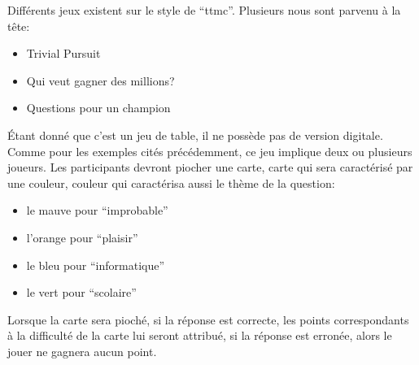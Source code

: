 Différents jeux existent sur le style de ``\acrlong{ttmc}''. Plusieurs nous sont parvenu à la tête:
\begin{itemize}
	\item Trivial Pursuit
	\item Qui veut gagner des millions?
	\item Questions pour un champion
\end{itemize}
Étant donné que c'est un jeu de table, il ne possède pas de version digitale.\\
Comme pour les exemples cités précédemment, ce jeu implique deux ou plusieurs joueurs. Les participants devront piocher une carte, carte qui sera caractérisé par une couleur, couleur qui caractérisa aussi le thème de la question:
\begin{itemize}
	\item le mauve pour ``improbable''
	\item l'orange pour ``plaisir''
	\item le bleu pour ``informatique''
	\item le vert pour ``scolaire''
\end{itemize}
Lorsque la carte sera pioché, si la réponse est correcte, les points correspondants à la difficulté de la carte lui seront attribué, si la réponse est erronée, alors le jouer ne gagnera aucun point.
